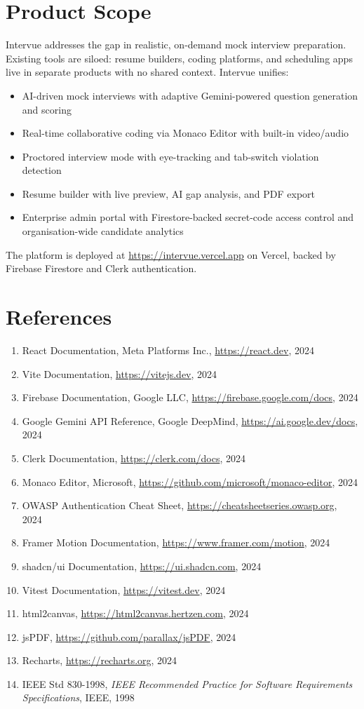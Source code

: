 \documentclass{fisatinternship}
\begin{document}
\section{Product Scope}
Intervue addresses the gap in realistic, on-demand mock interview preparation. Existing
tools are siloed: resume builders, coding platforms, and scheduling apps live in separate
products with no shared context. Intervue unifies:
\begin{itemize}
  \item AI-driven mock interviews with adaptive Gemini-powered question generation and scoring
  \item Real-time collaborative coding via Monaco Editor with built-in video/audio
  \item Proctored interview mode with eye-tracking and tab-switch violation detection
  \item Resume builder with live preview, AI gap analysis, and PDF export
  \item Enterprise admin portal with Firestore-backed secret-code access control and
        organisation-wide candidate analytics
\end{itemize}
The platform is deployed at \url{https://intervue.vercel.app} on Vercel, backed by
Firebase Firestore and Clerk authentication.

\section{References}
\begin{enumerate}
  \item React Documentation, Meta Platforms Inc., \url{https://react.dev}, 2024
  \item Vite Documentation, \url{https://vitejs.dev}, 2024
  \item Firebase Documentation, Google LLC, \url{https://firebase.google.com/docs}, 2024
  \item Google Gemini API Reference, Google DeepMind, \url{https://ai.google.dev/docs}, 2024
  \item Clerk Documentation, \url{https://clerk.com/docs}, 2024
  \item Monaco Editor, Microsoft, \url{https://github.com/microsoft/monaco-editor}, 2024
  \item OWASP Authentication Cheat Sheet, \url{https://cheatsheetseries.owasp.org}, 2024
  \item Framer Motion Documentation, \url{https://www.framer.com/motion}, 2024
  \item shadcn/ui Documentation, \url{https://ui.shadcn.com}, 2024
  \item Vitest Documentation, \url{https://vitest.dev}, 2024
  \item html2canvas, \url{https://html2canvas.hertzen.com}, 2024
  \item jsPDF, \url{https://github.com/parallax/jsPDF}, 2024
  \item Recharts, \url{https://recharts.org}, 2024
  \item IEEE Std 830-1998, \textit{IEEE Recommended Practice for Software Requirements
        Specifications}, IEEE, 1998
\end{enumerate}
\end{document}
